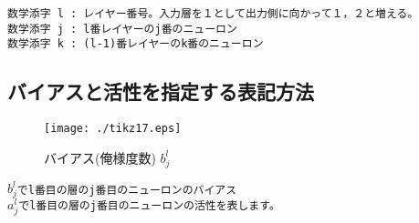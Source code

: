 \documentclass[11pt,a4paper,fleqn]{jsarticle}
\begin{document}
 \hspace{2mm} \verb|数学添字 l : レイヤー番号。入力層を１として出力側に向かって１，２と増える。| \\
 \hspace{5mm} \verb|数学添字 j : l番レイヤーのj番のニューロン |\\
 \hspace{5mm} \verb|数学添字 k : (l-1)番レイヤーのk番のニューロン |\\

\newpage
\subsection{バイアスと活性を指定する表記方法}

\begin{figure}[htbp]
 \begin{minipage}{0.5\hsize}
  \begin{center}
   \texttt{[image: ./tikz17.eps]}
  \end{center}
  \caption{バイアス(俺様度数) $b^l_{j}$}
 \end{minipage}
\end{figure}
 \hspace{2mm} $b^l_j$\verb|でl番目の層のj番目のニューロンのバイアス|\\
 \hspace{5mm} $a^l_j$\verb|でl番目の層のj番目のニューロンの活性を表します。|
\end{document}
